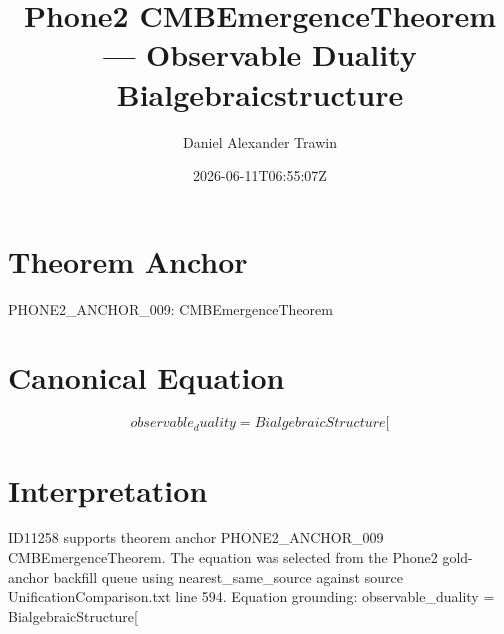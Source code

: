 \documentclass[11pt]{article}
\title{Phone2 CMBEmergenceTheorem — Observable Duality Bialgebraicstructure}
\author{Daniel Alexander Trawin}
\date{2026-06-11T06:55:07Z}
\begin{document}
\maketitle
\section*{Theorem Anchor}
PHONE2_ANCHOR_009: CMBEmergenceTheorem
\section*{Canonical Equation}
\[
observable_duality = BialgebraicStructure[
\]
\section*{Interpretation}
ID11258 supports theorem anchor PHONE2_ANCHOR_009 CMBEmergenceTheorem. The equation was selected from the Phone2 gold-anchor backfill queue using nearest_same_source against source UnificationComparison.txt line 594. Equation grounding: observable_duality = BialgebraicStructure[
\end{document}
